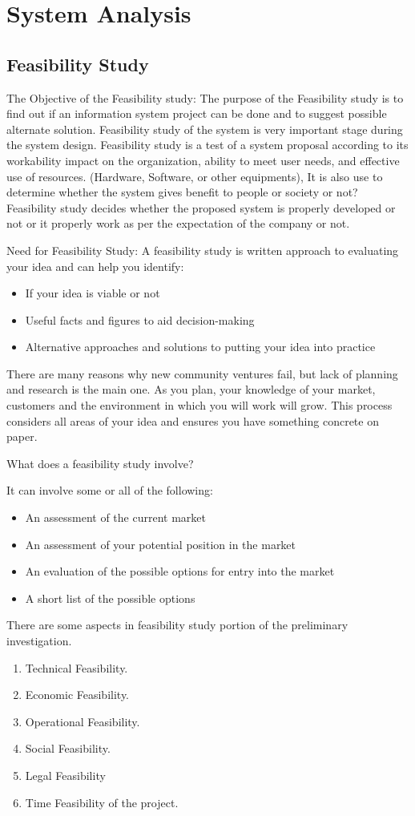 \chapter{System Analysis}
\section{Feasibility Study}
The Objective of the Feasibility study:
The purpose of the Feasibility study is to find out if an information system project can be done and to suggest possible alternate solution. Feasibility study of the system is very important stage during the system design. Feasibility study is a test of a system proposal according to its workability impact on the organization, ability to meet user needs, and effective use of resources. (Hardware, Software, or other equipments), It is also use to determine whether the system gives benefit to people or society or not? Feasibility study decides whether the proposed system is properly developed or not or it properly work as per the expectation of the company or not.

Need for Feasibility Study:
A feasibility study is written approach to evaluating your idea and can help you identify:
\begin{itemize}
\item If your idea is viable or not
\item Useful facts and figures to aid decision-making
\item Alternative approaches and solutions to putting your idea into practice
\end{itemize}
There are many reasons why new community ventures fail, but lack of planning and research is the main one. As you plan, your knowledge of your market, customers and the environment in which you will work will grow. This process considers all areas of your idea and ensures you have something concrete on paper.

What does a feasibility study involve?

It can involve some or all of the following:
\begin{itemize}
\item An assessment of the current market
\item An assessment of your potential position in the market
\item An evaluation of the possible options for entry into the market
\item A short list of the possible options
\end{itemize}
There are some aspects in feasibility study portion of the preliminary investigation.
\begin{enumerate}
  \item Technical Feasibility.
  \item Economic Feasibility.
  \item Operational Feasibility.
  \item Social Feasibility.
  \item Legal Feasibility
  \item Time Feasibility of the project.
\end{enumerate}

